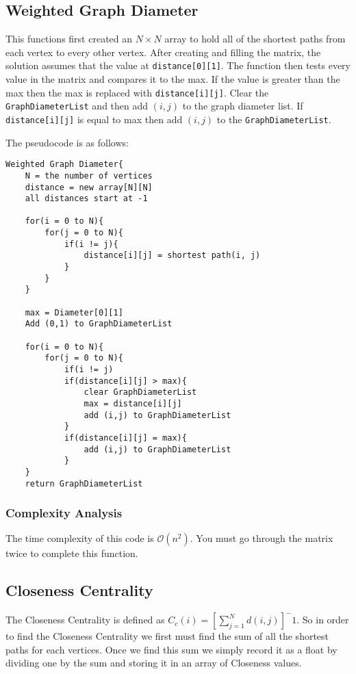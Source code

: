 \documentclass{article}
\begin{document}
\subsection{Weighted Graph Diameter}
This functions first created an $N \times N$ array to hold all of the shortest paths from each vertex to every other
vertex. After creating and filling the matrix, the solution assumes that the value at \texttt{distance[0][1]}. The function then tests every value in the matrix and compares it to the max. If the value is greater than the max then the max is replaced
with \texttt{distance[i][j]}. Clear the \texttt{GraphDiameterList} and then add $(i, j)$ to the graph diameter list. If \texttt{distance[i][j]} is equal to max then add $(i, j)$ to the \texttt{GraphDiameterList}.

The pseudocode is as follows:

\begin{verbatim}
Weighted Graph Diameter{
    N = the number of vertices
    distance = new array[N][N]
    all distances start at -1

    for(i = 0 to N){
        for(j = 0 to N){
            if(i != j){
                distance[i][j] = shortest path(i, j)
            }
        }
    }

    max = Diameter[0][1]
    Add (0,1) to GraphDiameterList

    for(i = 0 to N){
        for(j = 0 to N){
            if(i != j)
            if(distance[i][j] > max){
                clear GraphDiameterList
                max = distance[i][j]
                add (i,j) to GraphDiameterList
            }
            if(distance[i][j] = max){
                add (i,j) to GraphDiameterList
            }
    }
    return GraphDiameterList
\end{verbatim}

\subsubsection{Complexity Analysis}
The time complexity of this code is $\mathcal{O}(n^2)$. You must go through the matrix twice to complete this function.

\subsection{Closeness Centrality}
The Closeness Centrality is defined as $C_c(i) =[ \sum_{j=1}^{N} d(i,j)]^-1$. So in order to find the Closeness Centrality we first must find the sum of all the shortest paths for each vertices. Once we find this sum we simply record it as a float by dividing one by the sum and storing it in an array of Closeness values.
\end{document}
